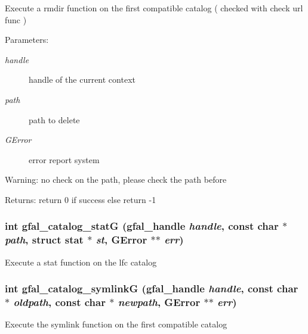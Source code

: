 Execute a rmdir function on the first compatible catalog ( checked with check url func ) \begin{Desc}
\item[Parameters:]
\begin{description}
\item[{\em handle}]handle of the current context \item[{\em path}]path to delete \item[{\em GError}]error report system \end{description}
\end{Desc}
\begin{Desc}
\item[Warning:]no check on the path, please check the path before \end{Desc}
\begin{Desc}
\item[Returns:]return 0 if success else return -1 \end{Desc}
\subsubsection{\setlength{\rightskip}{0pt plus 5cm}int gfal\_\-catalog\_\-stat\-G (gfal\_\-handle {\em handle}, const char $\ast$ {\em path}, struct stat $\ast$ {\em st}, GError $\ast$$\ast$ {\em err})}\label{gfal__common__catalog_8c_28ca68c00e4a67bc158975ef3e4f8013}


Execute a stat function on the lfc catalog 
\subsubsection{\setlength{\rightskip}{0pt plus 5cm}int gfal\_\-catalog\_\-symlink\-G (gfal\_\-handle {\em handle}, const char $\ast$ {\em oldpath}, const char $\ast$ {\em newpath}, GError $\ast$$\ast$ {\em err})}\label{gfal__common__catalog_8c_b4055bd8f8a33a10ef7a5814a0c1e1bf}


Execute the symlink function on the first compatible catalog 
